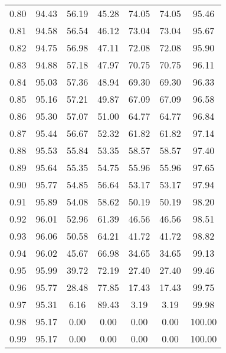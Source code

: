 \begin{tabular}{|c|c|c|c|c|c|c|}
      0.80 &     94.43 &     56.19 &      45.28 &   74.05 &      74.05 &         95.46 \\
      0.81 &     94.58 &     56.54 &      46.12 &   73.04 &      73.04 &         95.67 \\
      0.82 &     94.75 &     56.98 &      47.11 &   72.08 &      72.08 &         95.90 \\
      0.83 &     94.88 &     57.18 &      47.97 &   70.75 &      70.75 &         96.11 \\
      0.84 &     95.03 &     57.36 &      48.94 &   69.30 &      69.30 &         96.33 \\
      0.85 &     95.16 &     57.21 &      49.87 &   67.09 &      67.09 &         96.58 \\
      0.86 &     95.30 &     57.07 &      51.00 &   64.77 &      64.77 &         96.84 \\
      0.87 &     95.44 &     56.67 &      52.32 &   61.82 &      61.82 &         97.14 \\
      0.88 &     95.53 &     55.84 &      53.35 &   58.57 &      58.57 &         97.40 \\
      0.89 &     95.64 &     55.35 &      54.75 &   55.96 &      55.96 &         97.65 \\
      0.90 &     95.77 &     54.85 &      56.64 &   53.17 &      53.17 &         97.94 \\
      0.91 &     95.89 &     54.08 &      58.62 &   50.19 &      50.19 &         98.20 \\
      0.92 &     96.01 &     52.96 &      61.39 &   46.56 &      46.56 &         98.51 \\
      0.93 &     96.06 &     50.58 &      64.21 &   41.72 &      41.72 &         98.82 \\
      0.94 &     96.02 &     45.67 &      66.98 &   34.65 &      34.65 &         99.13 \\
      0.95 &     95.99 &     39.72 &      72.19 &   27.40 &      27.40 &         99.46 \\
      0.96 &     95.77 &     28.48 &      77.85 &   17.43 &      17.43 &         99.75 \\
      0.97 &     95.31 &      6.16 &      89.43 &    3.19 &       3.19 &         99.98 \\
      0.98 &     95.17 &      0.00 &       0.00 &    0.00 &       0.00 &        100.00 \\
      0.99 &     95.17 &      0.00 &       0.00 &    0.00 &       0.00 &        100.00 \\
\bottomrule
\end{tabular}
